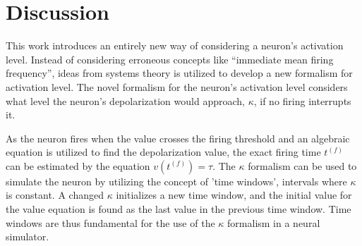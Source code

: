 


\section{Discussion}

This work introduces an entirely new way of considering a neuron's activation level.
Instead of considering erroneous concepts like ``immediate mean firing frequency'',  %
	ideas from systems theory is utilized to develop a new formalism for activation level.
The novel formalism for the neuron's activation level considers what level the neuron's depolarization would approach, $\kappa$, if no firing interrupts it.

As the neuron fires when the value crosses the firing threshold and an algebraic equation is utilized to find the depolarization value,
	the exact firing time $t^{(f)}$ can be estimated by the equation $v(t^{(f)}) = \tau$. 
The $\kappa$ formalism can be used to simulate the neuron by utilizing the concept of 'time windows', intervals where $\kappa$ is constant.
A changed $\kappa$ initializes a new time window, and the initial value for the value equation is found as the last value in the previous time window.
Time windows are thus fundamental for the use of the $\kappa$ formalism in a neural simulator.

 


